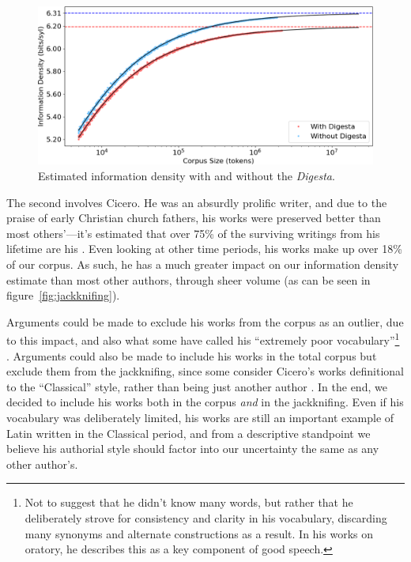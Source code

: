 \documentclass[12pt,twoside]{article}
\begin{document}
\begin{figure}[h]
\centering
\caption{Estimated information density with and without the \emph{Digesta}.}
\label{fig:digesta}
\noindent\includegraphics[width=\linewidth]{digesta}
\end{figure}

The second involves Cicero. He was an absurdly prolific writer, and due to the praise of early Christian church fathers, his works were preserved better than most others'---it's estimated that over 75\% of the surviving writings from his lifetime are his \citep{harrison}. Even looking at other time periods, his works make up over 18\% of our corpus. As such, he has a much greater impact on our information density estimate than most other authors, through sheer volume (as can be seen in figure~\ref{fig:jackknifing}).

Arguments could be made to exclude his works from the corpus as an outlier, due to this impact, and also what some have called his ``extremely poor vocabulary''\footnote{Not to suggest that he didn't know many words, but rather that he deliberately strove for consistency and clarity in his vocabulary, discarding many synonyms and alternate constructions as a result. In his works on oratory, he describes this as a key component of good speech.} \citep[136]{albrecht}. Arguments could also be made to include his works in the total corpus but exclude them from the jackknifing, since some consider Cicero's works definitional to the ``Classical'' style, rather than being just another author \citep[136]{albrecht}. In the end, we decided to include his works both in the corpus \emph{and} in the jackknifing. Even if his vocabulary was deliberately limited, his works are still an important example of Latin written in the Classical period, and from a descriptive standpoint we believe his authorial style should factor into our uncertainty the same as any other author's.
\end{document}
